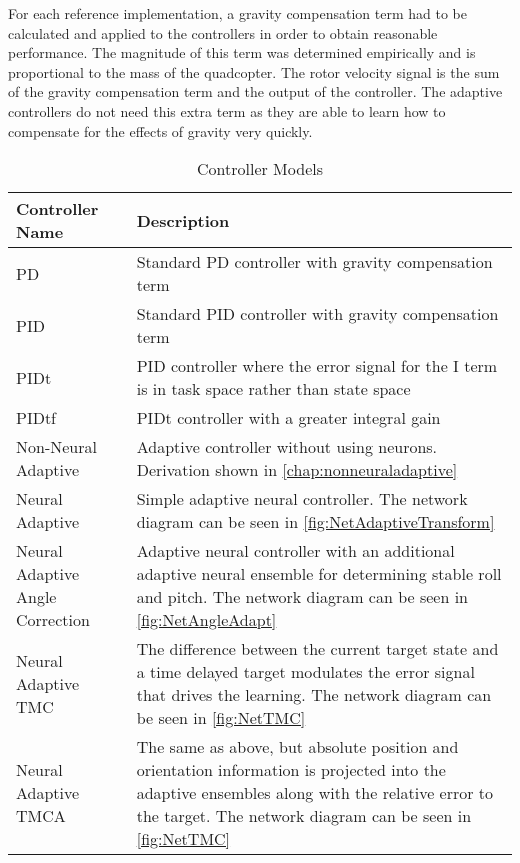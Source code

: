 \documentclass[letterpaper,12pt,titlepage,oneside,final]{book}
\begin{document}

For each reference implementation, a gravity compensation term had to be calculated and applied to the controllers in order to obtain reasonable performance. 
The magnitude of this term was determined empirically and is proportional to the mass of the quadcopter. 
The rotor velocity signal is the sum of the gravity compensation term and the output of the controller.
The adaptive controllers do not need this extra term as they are able to learn how to compensate for the effects of gravity very quickly.

\begin{table}
\caption{Controller Models} \label{table:controller_models}
\begin{center}
\begin{tabular}{| l | p{9cm} |}

\hline
\textbf{Controller Name} & \textbf{Description} \\ \hline
PD & Standard PD controller with gravity compensation term \\ \hline
PID & Standard PID controller with gravity compensation term \\ \hline
PIDt & PID controller where the error signal for the I term is in task space rather than state space \\ \hline
PIDtf & PIDt controller with a greater integral gain \\ \hline
Non-Neural Adaptive &  Adaptive controller without using neurons. Derivation shown in \autoref{chap:nonneuraladaptive} \\ \hline %
Neural Adaptive & Simple adaptive neural controller. The network diagram can be seen in \autoref{fig:NetAdaptiveTransform} \\ \hline
Neural Adaptive Angle Correction & Adaptive neural controller with an additional adaptive neural ensemble for determining stable roll and pitch. The network diagram can be seen in \autoref{fig:NetAngleAdapt} \\ \hline
Neural Adaptive TMC & The difference between the current target state and a time delayed target modulates the error signal that drives the learning. The network diagram can be seen in \autoref{fig:NetTMC} \\ \hline
Neural Adaptive TMCA & The same as above, but absolute position and orientation information is projected into the adaptive ensembles along with the relative error to the target. The network diagram can be seen in \autoref{fig:NetTMC} \\ \hline

\end{tabular}
\end{center}
\end{table}
\end{document}
